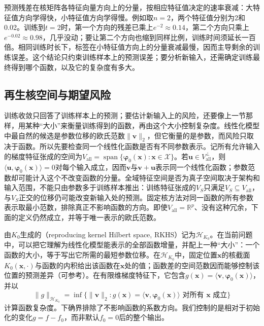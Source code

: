 预测残差在核矩阵各特征向量方向上的分量，按相应特征值决定的速率衰减：大特征值方向学得快，小特征值方向学得慢。例如取$n=2$，两个特征值分别为2和0.02。训练到$t=2$时，第一个方向的残差已乘上$e^{-2}\approx0.14$，第二个方向只乘上$e^{-0.02}\approx0.98$，几乎没动；要让第二个方向也缩到同样比例，训练时间须延长一百倍。相同训练时长下，标签在小特征值方向上的分量衰减最慢，因而主导剩余的训练误差。这个结论只约束训练样本上的预测误差；要分析新输入，还需确定训练最终得到哪个函数，以及它的复杂度有多大。

\subsection{再生核空间与期望风险}
\label{sec:ntk-rkhs-generalization}

训练收敛只回答了训练样本上的预测；要估计新输入上的风险，还要像上一节那样，用某种“大小”来衡量训练得到的函数，再由这个大小控制复杂度。线性化模型中最自然的候选是参数位移的欧氏范数$\|\bm v\|_2$，但它衡量的是参数，而风险只取决于函数。所以先要检查同一个线性化函数是否有不同参数表示。记所有允许输入的梯度特征张成的空间为$V_{\mathrm{all}}=\operatorname{span}\{\bm\varphi_0(\bm x):\bm x\in\mathcal X\}$。若$\bm u\in V_{\mathrm{all}}^\perp$，则$\langle\bm u,\bm\varphi_0(\bm x)\rangle=0$对每个输入成立，因而$\bm v$与$\bm v+\bm u$表示同一个线性化函数；参数范数却可能计入这个不改变函数的分量。全域特征空间是否为真子空间取决于架构和输入范围，不能只由参数多于训练样本推出：训练特征张成的$V_S$只满足$V_S\subseteq V_{\mathrm{all}}$，与$V_S$正交的位移仍可能改变新输入处的预测。固定核方法对同一函数的所有参数表示取最小范数，排除真正不影响函数的方向。即使$V_{\mathrm{all}}=\mathbb R^p$、没有这种冗余，下面的定义仍然成立，并等于唯一表示的欧氏范数。

由$K_0$生成的（reproducing kernel Hilbert space, RKHS）记为$\mathcal H_{K_0}$。在当前问题中，可以把它理解为线性化模型能表示的全部函数增量，并配上一种“大小”：一个函数的大小，等于写出它所需的最短参数位移。在$\mathcal H_{K_0}$中，固定位置$\bm x$的核截面$K_0(\bm x,\cdot)$与函数的内积给出该函数在$\bm x$处的值；函数差的空间范数因而能够控制该位置的预测差异（可参考）。在有限维梯度特征下，它包含$g(\bm x)=\langle\bm v,\bm\varphi_0(\bm x)\rangle$，并以
\[
 \|g\|_{\mathcal H_{K_0}}
 =\inf\{\|\bm v\|_2:g(\bm x)=\langle\bm v,\bm\varphi_0(\bm x)\rangle
                         \text{ 对所有 }\bm x\text{ 成立}\}
\]
计算函数复杂度。下确界排除了不影响函数的系数方向。我们控制的是相对于初始化的变化$g=f-f_0$，而非默认$f_0=0$后的整个输出。

